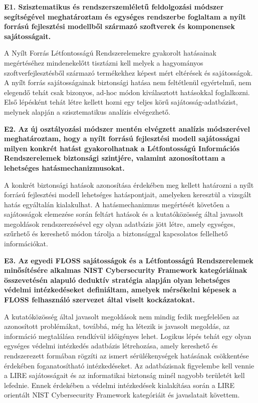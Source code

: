 \documentclass[12pt,magyar,a4paper,oneside]{scrreprt}
\begin{document}
\textbf{E1. Szisztematikus és rendszerszemléletű feldolgozási módszer
segítségével meghatároztam és egységes rendszerbe foglaltam a nyílt
forrású fejlesztési modellből származó szoftverek és komponensek
sajátosságait.}

A Nyílt Forrás Létfontosságú Rendszerelemekre gyakorolt hatásainak
megértéséhez mindenekelőtt tisztázni kell melyek a hagyományos
szoftverfejlesztésből származó termékekhez képest mért eltérések és
sajátosságok. A nyílt forrás sajátosságainak biztonsági hatása nem
feltétlenül egyértelmű, nem elegendő tehát csak bizonyos, ad-hoc módon
kiválasztott hatásokkal foglalkozni. Első lépésként tehát létre kellett
hozni egy teljes körű sajátosság-adatbázist, melynek alapján a
szisztematikus analízis elvégezhető.

\textbf{E2. Az új osztályozási módszer mentén elvégzett analízis
módszerével meghatároztam, hogy a nyílt forrású fejlesztési modell
sajátosságai milyen konkrét hatást gyakorolhatnak a Létfontosságú
Információs Rendszerelemek biztonsági szintjére, valamint azonosítottam
a lehetséges hatásmechanizmusokat.}

A konkrét biztonsági hatások azonosítása érdekében meg kellett határozni
a nyílt forrású fejlesztési modell lehetséges hatáspontjait, amelyeken
keresztül a vizsgált hatás egyáltalán kialakulhat. A hatásmechanizmus
megértését követően a sajátosságok elemezése során feltárt hatások és a
kutatóközösség által javasolt megoldások rendszerezésével egy olyan
adatbázis jött létre, amely egységes, szűrhető és kereshető módon
tárolja a biztonsággal kapcsolatos fellelhető információkat.

\textbf{E3. Az egyedi FLOSS sajátosságok és a Létfontosságú
Rendszerelemek minősítésére alkalmas NIST Cybersecurity Framework
kategóriáinak összevetésén alapuló deduktív stratégia alapján olyan
lehetséges védelmi intézkedéseket definiáltam, amelyek mérsékelni
képesek a FLOSS felhasználó szervezet által viselt kockázatokat.}

A kutatóközösség által javasolt megoldások nem mindig fedik megfelelően
az azonosított problémákat, továbbá, még ha létezik is javasolt
megoldás, az információ megtalálása rendkívül időigényes lehet. Logikus
lépés tehát egy olyan egységes védelmi intézkedés adatbázis létrehozása,
amely kereshető és rendszerezett formában rögzíti az ismert
sérülékenységek hatásának csökkentése érdekében foganatosítható
intézkedéseket. Az adatbázisnak figyelembe kell vennie a LIRE
sajátosságait és az informatikai biztonság minél nagyobb területét kell
lefednie. Ennek érdekében a védelmi intézkedések kialakítása során a
LIRE orientált NIST Cybersecurity Framework kategóriáit és javaslatait
követtem.
\end{document}
